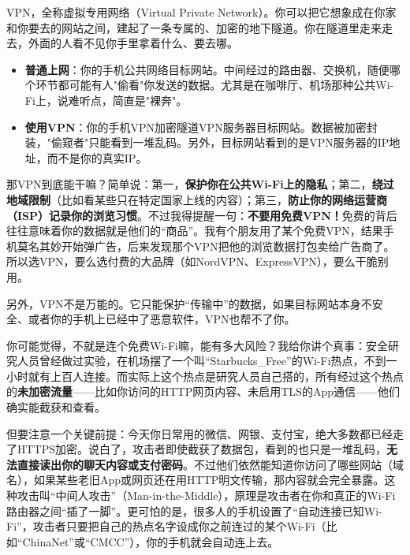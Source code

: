 


VPN，全称虚拟专用网络（Virtual Private Network）。你可以把它想象成在你家和你要去的网站之间，建起了一条专属的、加密的地下隧道。你在隧道里走来走去，外面的人看不见你手里拿着什么、要去哪。

\begin{itemize}
  \item \textbf{普通上网}：你的手机公共网络目标网站。中间经过的路由器、交换机，随便哪个环节都可能有人"偷看"你发送的数据。尤其是在咖啡厅、机场那种公共Wi-Fi上，说难听点，简直是"裸奔"。
  \item \textbf{使用VPN}：你的手机VPN加密隧道VPN服务器目标网站。数据被加密封装，"偷窥者"只能看到一堆乱码。另外，目标网站看到的是VPN服务器的IP地址，而不是你的真实IP。
\end{itemize}

那VPN到底能干嘛？简单说：第一，\textbf{保护你在公共Wi-Fi上的隐私}；第二，\textbf{绕过地域限制}（比如看某些只在特定国家上线的内容）；第三，\textbf{防止你的网络运营商（ISP）记录你的浏览习惯}。不过我得提醒一句：\textbf{不要用免费VPN！}免费的背后往往意味着你的数据就是他们的“商品”。我有个朋友用了某个免费VPN，结果手机莫名其妙开始弹广告，后来发现那个VPN把他的浏览数据打包卖给广告商了。所以选VPN，要么选付费的大品牌（如NordVPN、ExpressVPN），要么干脆别用。

另外，VPN不是万能的。它只能保护“传输中”的数据，如果目标网站本身不安全、或者你的手机上已经中了恶意软件，VPN也帮不了你。


你可能觉得，不就是连个免费Wi-Fi嘛，能有多大风险？我给你讲个真事：安全研究人员曾经做过实验，在机场摆了一个叫“Starbucks\_Free”的Wi-Fi热点，不到一小时就有上百人连接。而实际上这个热点是研究人员自己搭的，所有经过这个热点的\textbf{未加密流量}——比如你访问的HTTP网页内容、未启用TLS的App通信——他们确实能截获和查看。

但要注意一个关键前提：今天你日常用的微信、网银、支付宝，绝大多数都已经走了HTTPS加密。说白了，攻击者即使截获了数据包，看到的也只是一堆乱码，\textbf{无法直接读出你的聊天内容或支付密码}。不过他们依然能知道你访问了哪些网站（域名），如果某些老旧App或网页还在用HTTP明文传输，那内容就会完全暴露。这种攻击叫“中间人攻击”（Man-in-the-Middle），原理是攻击者在你和真正的Wi-Fi路由器之间“插了一脚”。更可怕的是，很多人的手机设置了“自动连接已知Wi-Fi”，攻击者只要把自己的热点名字设成你之前连过的某个Wi-Fi（比如“ChinaNet”或“CMCC”），你的手机就会自动连上去。

